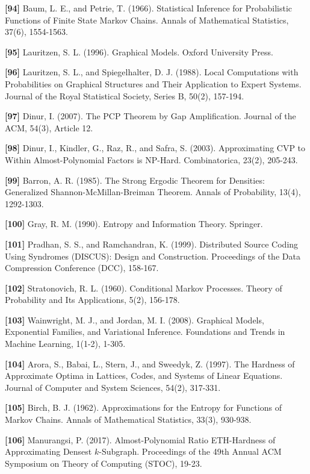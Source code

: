 \documentclass[
]{article}
\begin{document}
\textbf{{[}94{]}} Baum, L. E., and Petrie, T. (1966). Statistical
Inference for Probabilistic Functions of Finite State Markov Chains.
Annals of Mathematical Statistics, 37(6), 1554-1563.

\textbf{{[}95{]}} Lauritzen, S. L. (1996). Graphical Models. Oxford
University Press.

\textbf{{[}96{]}} Lauritzen, S. L., and Spiegelhalter, D. J. (1988).
Local Computations with Probabilities on Graphical Structures and
Their Application to Expert Systems. Journal of the Royal Statistical
Society, Series B, 50(2), 157-194.

\textbf{{[}97{]}} Dinur, I. (2007). The PCP Theorem by Gap
Amplification. Journal of the ACM, 54(3), Article 12.

\textbf{{[}98{]}} Dinur, I., Kindler, G., Raz, R., and Safra, S.
(2003). Approximating CVP to Within Almost-Polynomial Factors is
NP-Hard. Combinatorica, 23(2), 205-243.

\textbf{{[}99{]}} Barron, A. R. (1985). The Strong Ergodic Theorem
for Densities: Generalized Shannon-McMillan-Breiman Theorem. Annals
of Probability, 13(4), 1292-1303.

\textbf{{[}100{]}} Gray, R. M. (1990). Entropy and Information
Theory. Springer.

\textbf{{[}101{]}} Pradhan, S. S., and Ramchandran, K. (1999).
Distributed Source Coding Using Syndromes (DISCUS): Design and
Construction. Proceedings of the Data Compression Conference (DCC),
158-167.

\textbf{{[}102{]}} Stratonovich, R. L. (1960). Conditional Markov
Processes. Theory of Probability and Its Applications, 5(2), 156-178.

\textbf{{[}103{]}} Wainwright, M. J., and Jordan, M. I. (2008).
Graphical Models, Exponential Families, and Variational Inference.
Foundations and Trends in Machine Learning, 1(1-2), 1-305.

\textbf{{[}104{]}} Arora, S., Babai, L., Stern, J., and Sweedyk, Z.
(1997). The Hardness of Approximate Optima in Lattices, Codes, and
Systems of Linear Equations. Journal of Computer and System Sciences,
54(2), 317-331.

\textbf{{[}105{]}} Birch, B. J. (1962). Approximations for the Entropy
for Functions of Markov Chains. Annals of Mathematical Statistics,
33(3), 930-938.

\textbf{{[}106{]}} Manurangsi, P. (2017). Almost-Polynomial Ratio
ETH-Hardness of Approximating Densest $k$-Subgraph. Proceedings of the
49th Annual ACM Symposium on Theory of Computing (STOC), 19-23.
\end{document}
